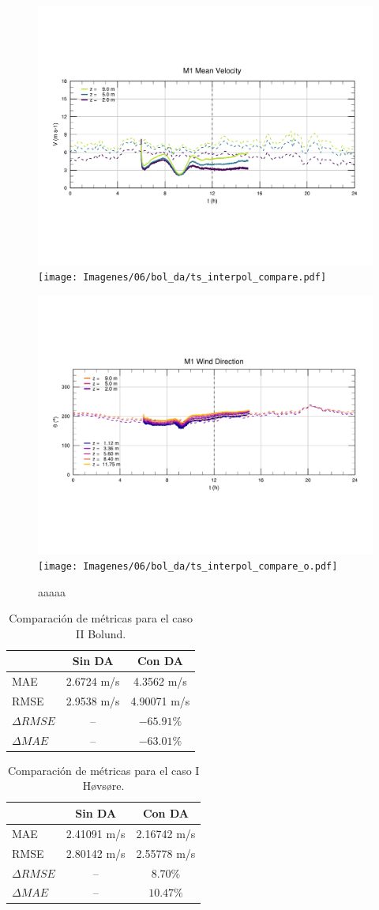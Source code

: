 \begin{figure}[H]
	\centering
	\includegraphics[width=0.5\linewidth,page=4,trim={9mm 57mm 10mm 60mm},clip]{Imagenes/06/bol/ts_interpol_compare.pdf}%
	\texttt{[image: Imagenes/06/bol\_da/ts\_interpol\_compare.pdf]}%
	
	\includegraphics[width=0.5\linewidth,page=4,trim={12mm 52mm 10mm 60mm},clip]{Imagenes/06/bol/ts_interpol_compare_o.pdf}%
	\texttt{[image: Imagenes/06/bol\_da/ts\_interpol\_compare\_o.pdf]}%
	\caption{aaaaa}
	\label{fig:06_bol_ts_m4}
\end{figure}


\begin{table}[h!]
	\caption{Comparación de métricas para el caso II Bolund.}
	\label{tab:06_bol_mae_rmse}
	\centering%
	\begin{tabular}{lcc}
		\toprule
		& Sin DA & Con DA \\
		\midrule
		MAE & 2.6724 m/s & 4.3562 m/s \\
		RMSE & 2.9538 m/s& 4.90071 m/s\\
		$\Delta{RMSE}$&  -- & $-65.91\%$ \\
		$\Delta{MAE}$ &  -- & $-63.01\%$ \\
		\bottomrule
	\end{tabular}
\end{table}
\begin{table}[H]
	\caption{Comparación de métricas para el caso I Høvsøre.}
	\label{tab:06_hov_mae_rmse}
	\centering%
	\begin{tabular}{lcc}
		\toprule
		& Sin DA & Con DA \\
		\midrule
		MAE & 2.41091 m/s & 2.16742 m/s \\
		RMSE & 2.80142 m/s& 2.55778 m/s\\
		$\Delta{RMSE}$& --  & $8.70\%$  \\
		$\Delta{MAE}$ & -- & $10.47\%$  \\
		\bottomrule
	\end{tabular}
\end{table}